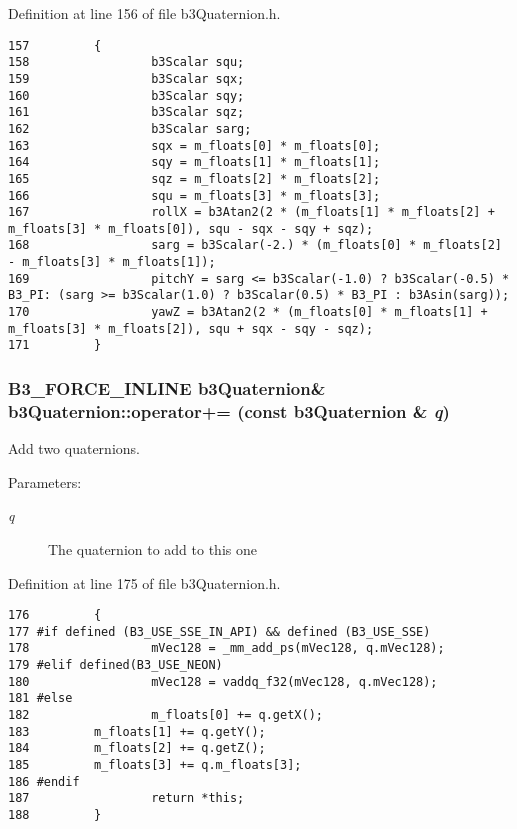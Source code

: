 Definition at line 156 of file b3Quaternion.h.

\begin{Code}\begin{verbatim}157         {
158                 b3Scalar squ;
159                 b3Scalar sqx;
160                 b3Scalar sqy;
161                 b3Scalar sqz;
162                 b3Scalar sarg;
163                 sqx = m_floats[0] * m_floats[0];
164                 sqy = m_floats[1] * m_floats[1];
165                 sqz = m_floats[2] * m_floats[2];
166                 squ = m_floats[3] * m_floats[3];
167                 rollX = b3Atan2(2 * (m_floats[1] * m_floats[2] + m_floats[3] * m_floats[0]), squ - sqx - sqy + sqz);
168                 sarg = b3Scalar(-2.) * (m_floats[0] * m_floats[2] - m_floats[3] * m_floats[1]);
169                 pitchY = sarg <= b3Scalar(-1.0) ? b3Scalar(-0.5) * B3_PI: (sarg >= b3Scalar(1.0) ? b3Scalar(0.5) * B3_PI : b3Asin(sarg));
170                 yawZ = b3Atan2(2 * (m_floats[0] * m_floats[1] + m_floats[3] * m_floats[2]), squ + sqx - sqy - sqz);
171         }
\end{verbatim}
\end{Code}


\hypertarget{classb3_quaternion_558450afdbe170892934fa936d085b1b}{
\subsubsection[operator+=]{\setlength{\rightskip}{0pt plus 5cm}B3\_\-FORCE\_\-INLINE {\bf b3Quaternion}\& b3Quaternion::operator+= (const {\bf b3Quaternion} \& {\em q})}}
\label{classb3_quaternion_558450afdbe170892934fa936d085b1b}


Add two quaternions. 

\begin{Desc}
\item[Parameters:]
\begin{description}
\item[{\em q}]The quaternion to add to this one \end{description}
\end{Desc}


Definition at line 175 of file b3Quaternion.h.

\begin{Code}\begin{verbatim}176         {
177 #if defined (B3_USE_SSE_IN_API) && defined (B3_USE_SSE)
178                 mVec128 = _mm_add_ps(mVec128, q.mVec128);
179 #elif defined(B3_USE_NEON)
180                 mVec128 = vaddq_f32(mVec128, q.mVec128);
181 #else   
182                 m_floats[0] += q.getX(); 
183         m_floats[1] += q.getY(); 
184         m_floats[2] += q.getZ(); 
185         m_floats[3] += q.m_floats[3];
186 #endif
187                 return *this;
188         }
\end{verbatim}
\end{Code}


